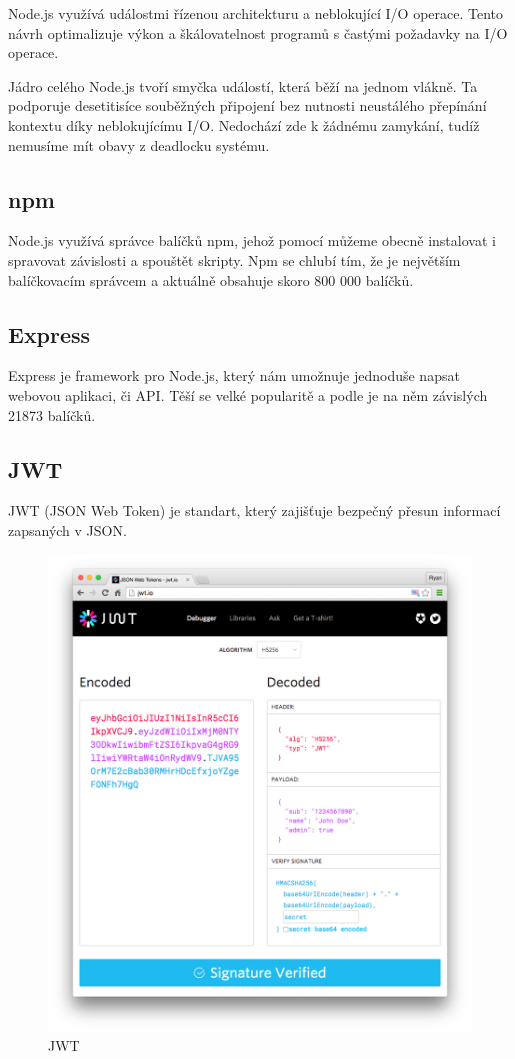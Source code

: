 \documentclass[thesis=B,czech]{FITthesis}[2012/06/26]
\begin{document}
            Node.js využívá událostmi řízenou architekturu a neblokující I/O operace. Tento návrh optimalizuje výkon a škálovatelnost programů s častými požadavky na I/O operace.
            
            Jádro celého Node.js tvoří smyčka událostí, která běží na jednom vlákně. Ta podporuje desetitisíce souběžných připojení bez nutnosti neustálého přepínání kontextu díky neblokujícímu I/O. Nedochází zde k žádnému zamykání, tudíž nemusíme mít obavy z deadlocku systému.
            \cite{node}
        \subsection{npm}
            Node.js využívá správce balíčků npm, jehož pomocí můžeme obecně instalovat i spravovat závislosti a spouštět skripty. Npm se chlubí tím, že je největším balíčkovacím správcem a aktuálně obsahuje skoro 800 000 balíčků.
            \cite{modulecounts}
        \subsection{Express}
            Express je framework pro Node.js, který nám umožnuje jednoduše napsat webovou aplikaci, či API. Těší se velké popularitě a podle \cite{npmrank} je na něm závislých 21873 balíčků.
        \subsection{JWT} \label{jwt}
            JWT (JSON Web Token) je standart, který zajišťuje bezpečný přesun informací zapsaných v JSON.
            \begin{figure}[h!]
                \includegraphics[scale=0.4]{legacy-app-auth-5} 
                \caption{JWT \cite{jwtImage}}
            \end{figure}
            
\end{document}

